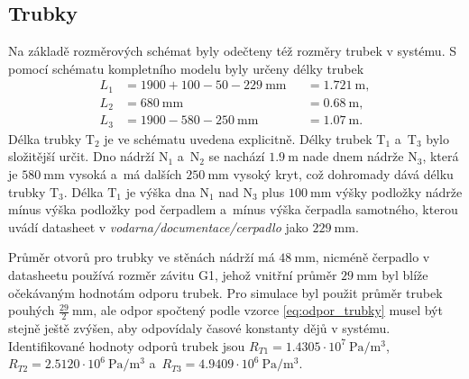 \documentclass[conference]{IEEEtran}
\begin{document}
\subsection{Trubky}
Na základě rozměrových schémat byly odečteny též rozměry trubek v systému.
S pomocí schématu kompletního modelu byly určeny délky trubek
\begin{equation}
    \begin{aligned}
        L_1 &= 1900+100-50-229~\si{\milli\metre} &&= 1.721~\si{\metre},\\
        L_2 &= 680~\si{\milli\metre} &&= 0.68~\si{\metre},\\
        L_3 &= 1900-580-250~\si{\milli\metre} &&= 1.07~\si{\metre}.
    \end{aligned}
\end{equation}
Délka trubky $\text{T}_2$ je ve schématu uvedena explicitně. Délky trubek $\text{T}_1$ a~$\text{T}_3$ bylo
složitější určit. Dno nádrží $\text{N}_1$ a~$\text{N}_2$ se nachází $1.9~\si{\metre}$ nade dnem nádrže $\text{N}_3$,
která je $580~\si{\milli\metre}$ vysoká a~má dalších $250~\si{\milli\metre}$ vysoký kryt, což dohromady dává délku trubky $\text{T}_3$.
Délka $\text{T}_1$ je výška dna $\text{N}_1$ nad $\text{N}_3$ plus $100~\si{\milli\metre}$ výšky podložky nádrže mínus výška
podložky pod čerpadlem a~mínus výška čerpadla samotného, kterou uvádí datasheet v \textit{vodarna/documentace/cerpadlo} jako $229~\si{\milli\metre}$.

Průměr otvorů pro trubky ve stěnách nádrží má $ 48~\si{\milli\metre}$, nicméně čerpadlo v datasheetu používá rozměr závitu G1,
jehož vnitřní průměr $ 29~\si{\milli\metre}$ byl blíže očekávaným hodnotám odporu trubek.
Pro simulace byl použit průměr trubek pouhých $ \frac{29}{2}~\si{\milli\metre}$, ale odpor spočtený podle vzorce \eqref{eq:odpor_trubky}
musel být stejně ještě zvýšen, aby odpovídaly časové konstanty dějů v systému. Identifikované hodnoty odporů trubek
jsou $R_{T1} = 1.4305 \cdot 10^7~\si{\pascal\per\metre\cubed}$, $R_{T2} = 2.5120 \cdot 10^6~\si{\pascal\per\metre\cubed}$ a~$R_{T3} = 4.9409 \cdot 10^6~\si{\pascal\per\metre\cubed}$.
\end{document}
